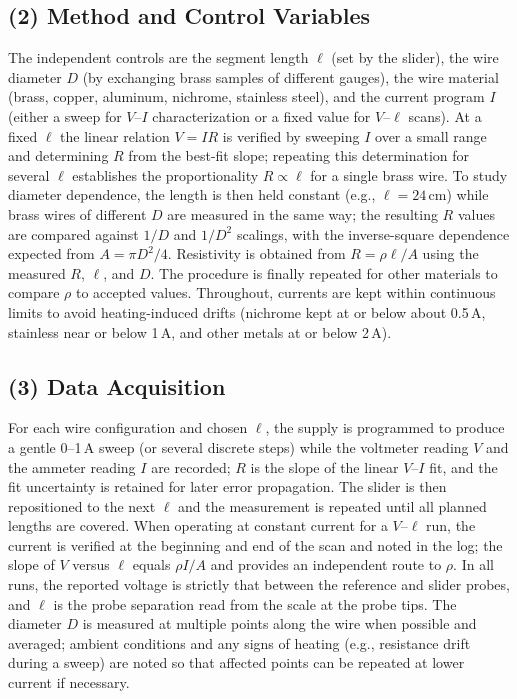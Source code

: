 \documentclass[12pt]{article}
\numberwithin{equation}{section}
\begin{document}
\subsection*{(2) Method and Control Variables}
The independent controls are the segment length $\ell$ (set by the slider), the wire diameter $D$ (by exchanging brass samples of different gauges), the wire material (brass, copper, aluminum, nichrome, stainless steel), and the current program $I$ (either a sweep for $V$--$I$ characterization or a fixed value for $V$--$\ell$ scans). At a fixed $\ell$ the linear relation $V=IR$ is verified by sweeping $I$ over a small range and determining $R$ from the best-fit slope; repeating this determination for several $\ell$ establishes the proportionality $R\propto \ell$ for a single brass wire. To study diameter dependence, the length is then held constant (e.g., $\ell=24$\,cm) while brass wires of different $D$ are measured in the same way; the resulting $R$ values are compared against $1/D$ and $1/D^{2}$ scalings, with the inverse-square dependence expected from $A=\pi D^2/4$. Resistivity is obtained from $R=\rho \ell/A$ using the measured $R$, $\ell$, and $D$. The procedure is finally repeated for other materials to compare $\rho$ to accepted values. Throughout, currents are kept within continuous limits to avoid heating-induced drifts (nichrome kept at or below about 0.5\,A, stainless near or below 1\,A, and other metals at or below 2\,A).

\subsection*{(3) Data Acquisition}
For each wire configuration and chosen $\ell$, the supply is programmed to produce a gentle 0--1\,A sweep (or several discrete steps) while the voltmeter reading $V$ and the ammeter reading $I$ are recorded; $R$ is the slope of the linear $V$--$I$ fit, and the fit uncertainty is retained for later error propagation. The slider is then repositioned to the next $\ell$ and the measurement is repeated until all planned lengths are covered. When operating at constant current for a $V$--$\ell$ run, the current is verified at the beginning and end of the scan and noted in the log; the slope of $V$ versus $\ell$ equals $\rho I/A$ and provides an independent route to $\rho$. In all runs, the reported voltage is strictly that between the reference and slider probes, and $\ell$ is the probe separation read from the scale at the probe tips. The diameter $D$ is measured at multiple points along the wire when possible and averaged; ambient conditions and any signs of heating (e.g., resistance drift during a sweep) are noted so that affected points can be repeated at lower current if necessary.
\end{document}
